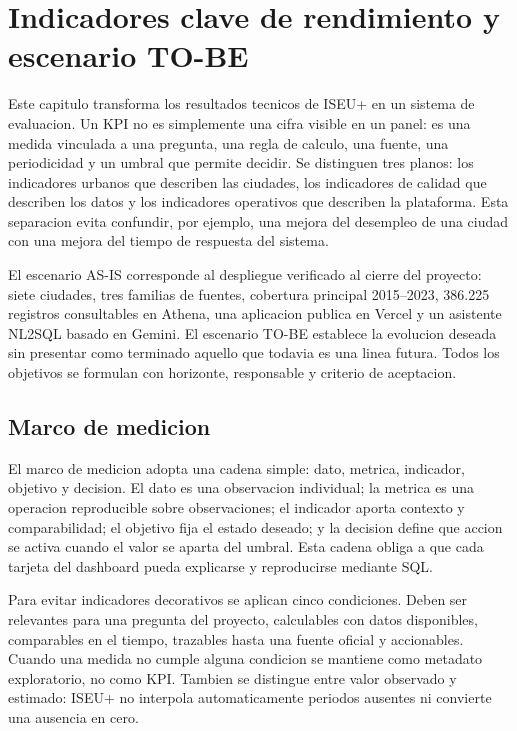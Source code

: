 \chapter{Indicadores clave de rendimiento y escenario TO-BE}
\label{ch:kpis-tobe}

Este capitulo transforma los resultados tecnicos de ISEU+ en un sistema de evaluacion. Un KPI no es simplemente una cifra visible en un panel: es una medida vinculada a una pregunta, una regla de calculo, una fuente, una periodicidad y un umbral que permite decidir. Se distinguen tres planos: los indicadores urbanos que describen las ciudades, los indicadores de calidad que describen los datos y los indicadores operativos que describen la plataforma. Esta separacion evita confundir, por ejemplo, una mejora del desempleo de una ciudad con una mejora del tiempo de respuesta del sistema.

El escenario AS-IS corresponde al despliegue verificado al cierre del proyecto: siete ciudades, tres familias de fuentes, cobertura principal 2015--2023, 386.225 registros consultables en Athena, una aplicacion publica en Vercel y un asistente NL2SQL basado en Gemini. El escenario TO-BE establece la evolucion deseada sin presentar como terminado aquello que todavia es una linea futura. Todos los objetivos se formulan con horizonte, responsable y criterio de aceptacion.

\section{Marco de medicion}

El marco de medicion adopta una cadena simple: dato, metrica, indicador, objetivo y decision. El dato es una observacion individual; la metrica es una operacion reproducible sobre observaciones; el indicador aporta contexto y comparabilidad; el objetivo fija el estado deseado; y la decision define que accion se activa cuando el valor se aparta del umbral. Esta cadena obliga a que cada tarjeta del dashboard pueda explicarse y reproducirse mediante SQL.

Para evitar indicadores decorativos se aplican cinco condiciones. Deben ser relevantes para una pregunta del proyecto, calculables con datos disponibles, comparables en el tiempo, trazables hasta una fuente oficial y accionables. Cuando una medida no cumple alguna condicion se mantiene como metadato exploratorio, no como KPI. Tambien se distingue entre valor observado y estimado: ISEU+ no interpola automaticamente periodos ausentes ni convierte una ausencia en cero.

